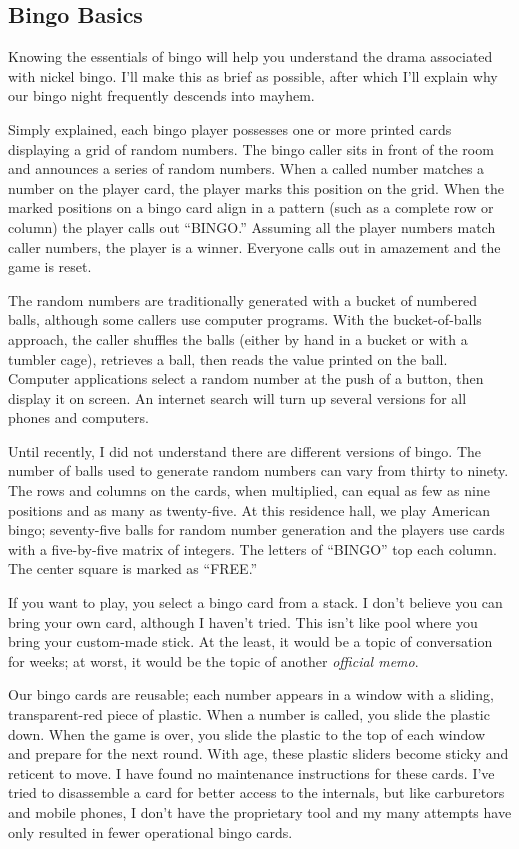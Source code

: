 \documentclass[
  letterpaper,
  DIV=11,
  numbers=noendperiod]{scrartcl}
\begin{document}
\hypertarget{bingo-basics}{%
\subsection{Bingo Basics}\label{bingo-basics}}

Knowing the essentials of bingo will help you understand the drama
associated with nickel bingo. I'll make this as brief as possible, after
which I'll explain why our bingo night frequently descends into mayhem.

Simply explained, each bingo player possesses one or more printed cards
displaying a grid of random numbers. The bingo caller sits in front of
the room and announces a series of random numbers. When a called number
matches a number on the player card, the player marks this position on
the grid. When the marked positions on a bingo card align in a pattern
(such as a complete row or column) the player calls out ``BINGO.''
Assuming all the player numbers match caller numbers, the player is a
winner. Everyone calls out in amazement and the game is reset.

The random numbers are traditionally generated with a bucket of numbered
balls, although some callers use computer programs. With the
bucket-of-balls approach, the caller shuffles the balls (either by hand
in a bucket or with a tumbler cage), retrieves a ball, then reads the
value printed on the ball. Computer applications select a random number
at the push of a button, then display it on screen. An internet search
will turn up several versions for all phones and computers.

Until recently, I did not understand there are different versions of
bingo. The number of balls used to generate random numbers can vary from
thirty to ninety. The rows and columns on the cards, when multiplied,
can equal as few as nine positions and as many as twenty-five. At this
residence hall, we play American bingo; seventy-five balls for random
number generation and the players use cards with a five-by-five matrix
of integers. The letters of ``BINGO'' top each column. The center square
is marked as ``FREE.''

If you want to play, you select a bingo card from a stack. I don't
believe you can bring your own card, although I haven't tried. This
isn't like pool where you bring your custom-made stick. At the least, it
would be a topic of conversation for weeks; at worst, it would be the
topic of another \emph{official memo}.

Our bingo cards are reusable; each number appears in a window with a
sliding, transparent-red piece of plastic. When a number is called, you
slide the plastic down. When the game is over, you slide the plastic to
the top of each window and prepare for the next round. With age, these
plastic sliders become sticky and reticent to move. I have found no
maintenance instructions for these cards. I've tried to disassemble a
card for better access to the internals, but like carburetors and mobile
phones, I don't have the proprietary tool and my many attempts have only
resulted in fewer operational bingo cards.
\end{document}
